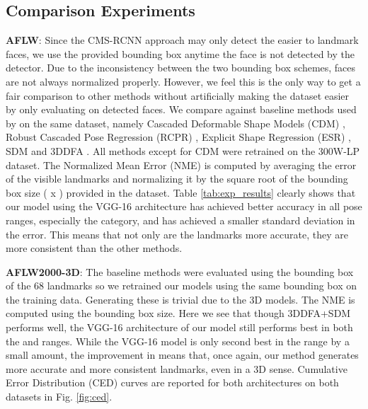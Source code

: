 \documentclass[10pt,twocolumn,letterpaper]{article}
\begin{document}
\subsection{Comparison Experiments}
\textbf{AFLW}: Since the CMS-RCNN approach may only detect the easier to landmark faces, we use the provided bounding box anytime the face is not detected by the detector. Due to the inconsistency between the two bounding box schemes, faces are not always normalized properly. However, we feel this is the only way to get a fair comparison to other methods without artificially making the dataset easier by only evaluating on detected faces. We compare against baseline methods used by \cite{Zhu16falp} on the same dataset, namely Cascaded Deformable Shape Models (CDM) \cite{cdm}, Robust Cascaded Pose Regression (RCPR) \cite{rcpr}, Explicit Shape Regression (ESR) \cite{esr}, SDM \cite{xiong2013supervised} and 3DDFA \cite{Zhu16falp}. All methods except for CDM were retrained on the 300W-LP dataset. The Normalized Mean Error (NME) is computed by averaging the error of the visible landmarks and normalizing it by the square root of the bounding box size ( x ) provided in the dataset. Table \ref{tab:exp_results} clearly shows that our model using the VGG-16 architecture has achieved better accuracy in all pose ranges, especially the  category, and has achieved a smaller standard deviation in the error. This means that not only are the landmarks more accurate, they are more consistent than the other methods.


\textbf{AFLW2000-3D}: The baseline methods were evaluated using the bounding box of the 68 landmarks so we retrained our models using the same bounding box on the training data. Generating these is trivial due to the 3D models. The NME is computed using the bounding box size. Here we see that though 3DDFA+SDM performs well, the VGG-16 architecture of our model still performs best in both the  and  ranges. While the VGG-16 model is only second best in the  range by a small amount, the improvement in  means that, once again, our method generates more accurate and more consistent landmarks, even in a 3D sense. Cumulative Error Distribution (CED) curves are reported for both architectures on both datasets in Fig. \ref{fig:ced}.
\end{document}
